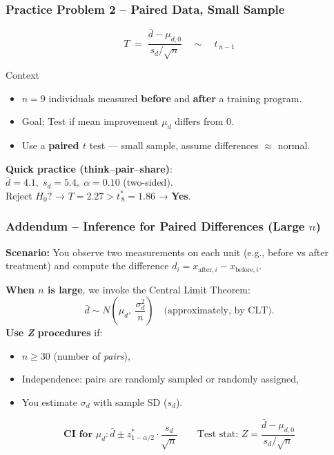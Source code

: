 \documentclass[handout]{beamer}
\begin{document}
\begin{frame}
\frametitle{Practice Problem 2 -- Paired Data, Small Sample}

\[
T \;=\;\frac{\bar d - \mu_{d,0}}{s_d/\sqrt n}\quad\sim\quad t_{\,n-1}
\]

\vspace{-0.5em}

\begin{block}{Context}
\begin{itemize}\setlength\itemsep{0.4em}
  \item \(n=9\) individuals measured \textbf{before} and \textbf{after} a training program.
  \item Goal: Test if mean improvement \(\mu_d\) differs from 0.
  \item Use a \textbf{paired \(t\)} test — small sample, assume differences $\approx$ normal.
\end{itemize}
\end{block}

\pause

\textbf{Quick practice (think–pair–share)}:\\
\(\bar d=4.1,\; s_d=5.4,\; \alpha=0.10\) (two-sided).\\
Reject \(H_0\)? → \(T = 2.27 > t^{\ast}_{\,8} = 1.86\) → \textbf{Yes}.

\end{frame}

\begin{frame}
\frametitle{Addendum -- Inference for Paired Differences (Large $n$)}
\small

\textbf{Scenario:} You observe two measurements on each unit (e.g., before vs after treatment)
and compute the difference $d_i = x_{\text{after},i} - x_{\text{before},i}$.

\vspace{0.6em}
\textbf{When $n$ is large}, we invoke the Central Limit Theorem:
\[
\bar{d} \sim N\left(\mu_d,\ \frac{\sigma_d^2}{n}\right)
\quad\text{(approximately, by CLT)}.
\]
\textbf{Use \textit{Z} procedures} if:
\begin{itemize}
  \item $n \ge 30$ (number of \textit{pairs}),
  \item Independence: pairs are randomly sampled or randomly assigned,
  \item You estimate $\sigma_d$ with sample SD ($s_d$).
\end{itemize}


\[
\textbf{CI for $\mu_d$}: \bar{d} \pm z^{\ast}_{1-\alpha/2} \cdot \frac{s_d}{\sqrt{n}}
\qquad \text{Test stat: } Z = \frac{\bar{d} - \mu_{d,0}}{s_d/\sqrt{n}}
\]

\end{frame}
\end{document}
